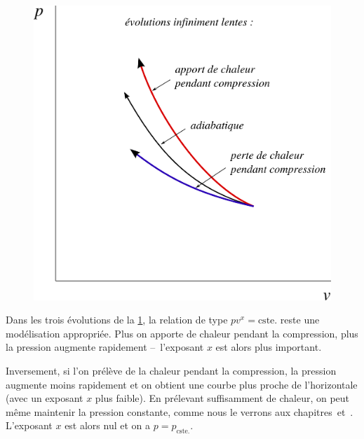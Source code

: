 		\begin{figure}
			\begin{center}
			\includegraphics[width=\didacticpvdiagramwidth]{images/pv_transfert_chaleur.png}
			\end{center}
			\label{fig_p-v_ajout_retrait_chaleur}
		\end{figure}


		Dans les trois évolutions de la \cref{fig_p-v_ajout_retrait_chaleur}, la relation de type $p v^{x} = \text{cste.}$ reste une modélisation appropriée. Plus on apporte de chaleur pendant la compression, plus la pression augmente rapidement --\ l’exposant $x$ est alors plus important.

		Inversement, si l’on prélève de la chaleur pendant la compression, la pression augmente moins rapidement et on obtient une courbe plus proche de l’horizontale (avec un exposant $x$ plus faible). En prélevant suffisamment de chaleur, on peut même maintenir la pression constante, comme nous le verrons aux chapitres~\quatre et~\cinq. L’exposant $x$ est alors nul et on a $p = p_\text{cste.}$.
		
